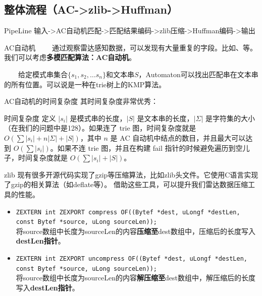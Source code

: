 \documentclass[10pt]{ctexbeamer}
\begin{document}
\subsection{整体流程（AC->zlib->Huffman）}
\begin{frame}{PipeLine}
  输入->AC自动机匹配->匹配结果编码->zlib压缩->Huffman编码->输出
\end{frame}
\begin{frame}{AC自动机}
  \ \ \ \ 通过观察雷达感知数据，可以发现有大量重复的字段。比如、等。
  我们可以考虑\textbf{多模匹配算法：AC自动机}。

  \ \ \ \ 给定模式串集合$\{s_1,s_2,\dots s_n\}$和文本串$S$，Automaton可以找出匹配串在文本串的所有位置。可以说是一种在trie树上的KMP算法。

\end{frame}

\begin{frame}{AC自动机的时间复杂度}
其时间复杂度非常优秀：
\begin{block}{时间复杂度}
  定义 $|s_i|$ 是模式串的长度，$|S|$ 是文本串的长度，$|\Sigma|$ 是字符集的大小（在我们的问题中是128）。如果连了 trie 图，时间复杂度就是 $O(\sum|s_i|+n|\Sigma|+|S|)$，其中 $n$ 是 AC 自动机中结点的数目，并且最大可以达到 $O(\sum|s_i|)$。如果不连 trie 图，并且在构建 fail 指针的时候避免遍历到空儿子，时间复杂度就是 $O(\sum|s_i|+|S|)$。
\end{block} 
\end{frame}
\begin{frame}{zlib}
  现有很多开源代码实现了gzip等压缩算法，比如zlib头文件。它使用C语言实现了gzip的相关算法（如deflate等）。
  借助这些工具，可以提升我们雷达数据压缩工具的性能。
  \begin{itemize}
    \item \texttt{ZEXTERN int ZEXPORT compress OF((Bytef *dest,   uLongf *destLen, const Bytef *source, uLong sourceLen));}\\
      将source数组中长度为sourceLen的内容\textbf{压缩至}dest数组中，压缩后的长度写入\textbf{destLen指针}。
    \item \texttt{ZEXTERN int ZEXPORT uncompress OF((Bytef *dest,   uLongf *destLen, const Bytef *source, uLong sourceLen));}\\
    将source数组中长度为sourceLen的内容\textbf{解压缩至}dest数组中，解压缩后的长度写入\textbf{destLen指针}。
  \end{itemize}
\end{frame}
\end{document}
